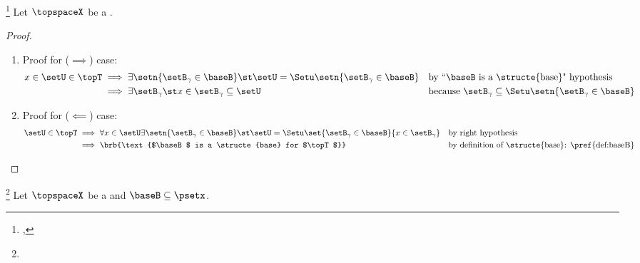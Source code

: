 \begin{theorem}
\label{thm:basex}
\footnote{
  ,
  }
Let $\topspaceX$ be a  .
\end{theorem}
\begin{proof}
\begin{enumerate}
  \item Proof for ($\implies$) case:
    \begin{align*}
      x\in\setU\in\topT
        &\implies \exists\setn{\setB_\gamma\in\baseB} \st \setU=\Setu\setn{\setB_\gamma\in\baseB}
        && \text{by ``$\baseB$ is a \structe{base}" hypothesis}
      \\&\implies \exists \setB_\gamma \st x\in\setB_\gamma\subseteq\setU
        && \text{because $\setB_\gamma\subseteq\Setu\setn{\setB_\gamma\in\baseB}$}
    \end{align*}

  \item Proof for ($\impliedby$) case:
    \begin{align*}
      \setU\in\topT
        &\implies \forall x\in\setU\exists\setn{\setB_\gamma\in\baseB} \st \setU=\Setu\set{\setB_\gamma\in\baseB}{x\in\setB_\gamma}
        && \text{by right hypothesis}
      \\&\implies \brb{\text{$\baseB$ is a \structe{base} for $\topT$}}
        && \text{by definition of \structe{base}: \pref{def:baseB}}
    \end{align*}
\end{enumerate}
\end{proof}

\begin{theorem}
\label{thm:top_base}
\footnote{
  }
Let $\topspaceX$ be a   and $\baseB\subseteq\psetx$.
\end{theorem}

